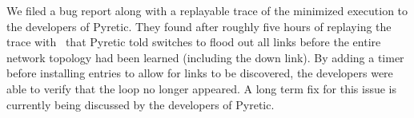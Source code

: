
We filed a bug report along with a replayable trace of the
minimized execution to the developers of Pyretic. They found after roughly
five hours of replaying the trace with \projectname~that Pyretic told switches to
flood out all links before the entire
network topology had been learned (including the down link). By adding a timer before installing
entries to allow for links to be discovered, the developers were able to verify
that the loop no longer appeared. A long term fix for this issue is currently being discussed by the developers of
Pyretic.\\[0.5ex]
